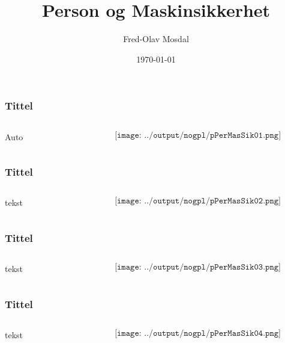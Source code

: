\documentclass[aspectratio=169,xcolor=dvipsnames]{beamer}
\title[permas]{Person og Maskinsikkerhet} %
\author[Fred-Olav] {Fred-Olav Mosdal}
\institute[Gand VGS] %
{
    Gand VGS \\
    VG3 Automasjon }
\date{\today} %
\begin{document}
\begin{frame}
	\frametitle{Tittel}
	\begin{columns}
		\begin{column}{0.5\textwidth}
Auto
			
		\end{column}

		\begin{column}{0.5\textheight}
	$$\texttt{[image: ../output/nogpl/pPerMasSik01.png]}$$
		\end{column}
	\end{columns}
\end{frame}

\begin{frame}
	\frametitle{Tittel}
	\begin{columns}
		\begin{column}{0.5\textwidth}
tekst
			
		\end{column}

		\begin{column}{0.5\textwidth}
	$$\texttt{[image: ../output/nogpl/pPerMasSik02.png]}$$
		\end{column}
	\end{columns}
\end{frame}

\begin{frame}
	\frametitle{Tittel}
	\begin{columns}
		\begin{column}{0.5\textwidth}
tekst
			
		\end{column}

		\begin{column}{0.5\textwidth}
	$$\texttt{[image: ../output/nogpl/pPerMasSik03.png]}$$
		\end{column}
	\end{columns}
\end{frame}

\begin{frame}
	\frametitle{Tittel}
	\begin{columns}
		\begin{column}{0.5\textwidth}
tekst
			
		\end{column}

		\begin{column}{0.5\textwidth}
	$$\texttt{[image: ../output/nogpl/pPerMasSik04.png]}$$
		\end{column}
	\end{columns}
\end{frame}
\end{document}
